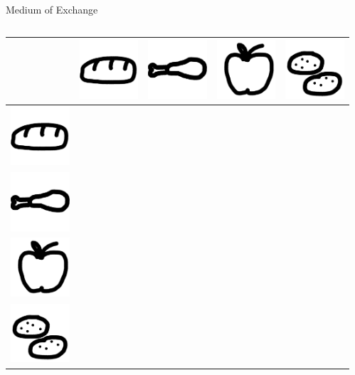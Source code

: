 \documentclass[]{beamer}
\begin{document}
\begin{frame}{Medium of Exchange}
\begin{columns}[T]
\begin{column}{0.5\textwidth}
{\begin{scriptsize}
\begin{center}
\begin{tabular}{l||c|c|c|c}
			    				& \includegraphics[height = 0.05\textheight]{../assets/images/bread} & \includegraphics[height = 0.05\textheight]{../assets/images/meat} & \includegraphics[height = 0.05\textheight]{../assets/images/apple} & \includegraphics[height = 0.05\textheight]{../assets/images/potatoes} \\ \hline \hline
							\includegraphics[height = 0.05\textheight]{../assets/images/bread}    & \cellcolor{black!50} & \cellcolor{highlight!50} & \cellcolor{highlight!50} & \cellcolor{highlight!50} \\ \hline
							\includegraphics[height = 0.05\textheight]{../assets/images/meat} &      & \cellcolor{black!50} & \cellcolor{highlight!50} & \cellcolor{highlight!50} \\ \hline
							\includegraphics[height = 0.05\textheight]{../assets/images/apple}  &      &         & \cellcolor{black!50} & \cellcolor{highlight!50} \\ \hline
							\includegraphics[height = 0.05\textheight]{../assets/images/potatoes}    &      &         &        & \cellcolor{black!50} \\
						\end{tabular}
					\end{center}
				\end{scriptsize}
			}
		\end{column}
		\begin{column}{0.5\textwidth}
\end{column}
\end{columns}
\end{frame}
\end{document}
